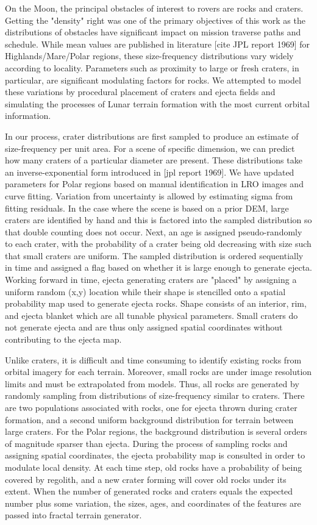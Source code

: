 \documentclass[twocolumn,letterpaper]{IEEEAerospaceCLS}  %
\begin{document}
On the Moon, the principal obstacles of interest to rovers are rocks and craters. Getting the "density" right was one of the primary objectives of this work as the distributions of obstacles have significant impact on mission traverse paths and schedule. While mean values are published in literature [cite JPL report 1969] for Highlands/Mare/Polar regions, these size-frequency distributions vary widely according to locality. Parameters such as proximity to large or fresh craters, in particular, are significant modulating factors for rocks. We attempted to model these variations by procedural placement of craters and ejecta fields and simulating the processes of Lunar terrain formation with the most current orbital information. 

In our process, crater distributions are first sampled to produce an estimate of size-frequency per unit area. For a scene of specific dimension, we can predict how many craters of a particular diameter are present. These distributions take an inverse-exponential form introduced in [jpl report 1969]. We have updated parameters for Polar regions based on manual identification in LRO images and curve fitting. Variation from uncertainty is allowed by estimating sigma from fitting residuals. In the case where the scene is based on a prior DEM, large craters are identified by hand and this is factored into the sampled distribution so that double counting does not occur. Next, an age is assigned pseudo-randomly to each crater, with the probability of a crater being old decreasing with size such that small craters are uniform. The sampled distribution is ordered sequentially in time and assigned a flag based on whether it is large enough to generate ejecta. Working forward in time, ejecta generating craters are "placed" by assigning a uniform random (x,y) location while their shape is stencilled onto a spatial probability map used to generate ejecta rocks. Shape consists of an interior, rim, and ejecta blanket which are all tunable physical parameters. Small craters do not generate ejecta and are thus only assigned spatial coordinates without contributing to the ejecta map.           

Unlike craters, it is difficult and time consuming to identify existing rocks from orbital imagery for each terrain. Moreover, small rocks are under image resolution limits and must be extrapolated from models. Thus, all rocks are generated by randomly sampling from distributions of size-frequency similar to craters. There are two populations associated with rocks, one for ejecta thrown during crater formation, and a second uniform background distribution for terrain between large craters. For the Polar regions, the background distribution is several orders of magnitude sparser than ejecta. During the process of sampling rocks and assigning spatial coordinates, the ejecta probability map is consulted in order to modulate local density. At each time step, old rocks have a probability of being covered by regolith, and a new crater forming will cover old rocks under its extent. When the number of generated rocks and craters equals the expected number plus some variation, the sizes, ages, and coordinates of the features are passed into fractal terrain generator.     
\end{document}
